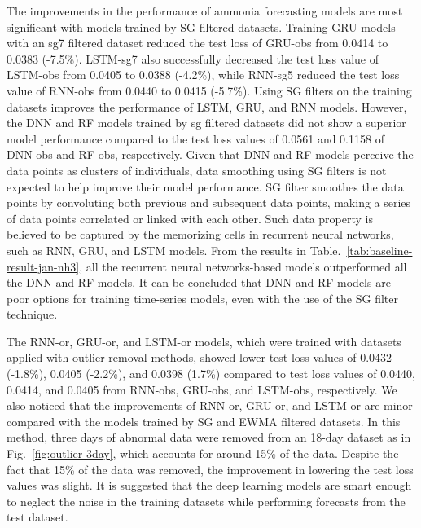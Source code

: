 The improvements in the performance of ammonia forecasting models are most significant with models trained by SG filtered datasets. Training GRU models with an sg7 filtered dataset reduced the test loss of GRU-obs from 0.0414 to 0.0383 (-7.5\%). LSTM-sg7 also successfully decreased the test loss value of LSTM-obs from 0.0405 to 0.0388 (-4.2\%), while RNN-sg5 reduced the test loss value of RNN-obs from 0.0440 to 0.0415 (-5.7\%). Using SG filters on the training datasets improves the performance of LSTM, GRU, and RNN models. However, the DNN and RF models trained by sg filtered datasets did not show a superior model performance compared to the test loss values of 0.0561 and 0.1158 of DNN-obs and RF-obs, respectively. Given that DNN and RF models perceive the data points as clusters of individuals, data smoothing using SG filters is not expected to help improve their model performance. SG filter smoothes the data points by convoluting both previous and subsequent data points, making a series of data points correlated or linked with each other. Such data property is believed to be captured by the memorizing cells in recurrent neural networks, such as RNN, GRU, and LSTM models. From the results in Table.~\ref{tab:baseline-result-jan-nh3}, all the recurrent neural networks-based models outperformed all the DNN and RF models. It can be concluded that DNN and RF models are poor options for training time-series models, even with the use of the SG filter technique.

The RNN-or, GRU-or, and LSTM-or models, which were trained with datasets applied with outlier removal methods, showed lower test loss values of 0.0432 (-1.8\%), 0.0405 (-2.2\%), and 0.0398 (1.7\%) compared to test loss values of 0.0440, 0.0414, and 0.0405 from RNN-obs, GRU-obs, and LSTM-obs, respectively. We also noticed that the improvements of RNN-or, GRU-or, and LSTM-or are minor compared with the models trained by SG and EWMA filtered datasets. In this method, three days of abnormal data were removed from an 18-day dataset as in Fig.~\ref{fig:outlier-3day}, which accounts for around 15\% of the data. Despite the fact that 15\% of the data was removed, the improvement in lowering the test loss values was slight. It is suggested that the deep learning models are smart enough to neglect the noise in the training datasets while performing forecasts from the test dataset.

